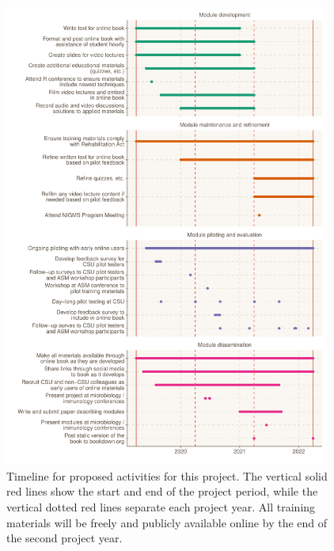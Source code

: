 \documentclass[pdftex,english,11.5pt,parskip=half]{scrartcl}
\begin{document}
\clearpage

\begin{figure}[ht]
    \centering
    \includegraphics[width=0.95\textwidth]{figures/timeline.pdf}
    \caption{Timeline for proposed activities for this project. The vertical solid red lines show the start and end of the project period, while the vertical dotted red lines separate each project year. All training materials will be freely and publicly available online by the end of the second project year.}
    \label{fig:timeline}
\end{figure}

\clearpage



\end{document}
